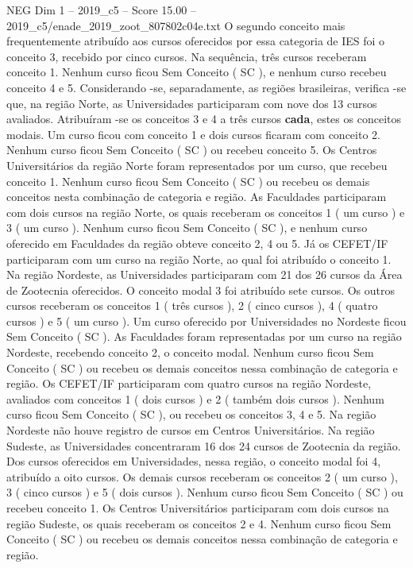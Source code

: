 \begin{textsample}{NEG Dim 1 – 2019\_c5 – Score 15.00 – 2019\_c5/enade\_2019\_zoot\_807802c04e.txt}
O segundo conceito mais frequentemente atribuído aos cursos oferecidos por essa categoria de IES foi o conceito 3, recebido por cinco cursos.
Na sequência, três cursos receberam conceito 1.
Nenhum curso ficou Sem Conceito ( SC ), e nenhum curso recebeu conceito 4 e 5.
Considerando -se, separadamente, as regiões brasileiras, verifica -se que, na região Norte, as Universidades participaram com nove dos 13 cursos avaliados.
Atribuíram -se os conceitos 3 e 4 a três cursos \textbf{cada}, estes os conceitos modais.
Um curso ficou com conceito 1 e dois cursos ficaram com conceito 2.
Nenhum curso ficou Sem Conceito ( SC ) ou recebeu conceito 5.
Os Centros Universitários da região Norte foram representados por um curso, que recebeu conceito 1.
Nenhum curso ficou Sem Conceito ( SC ) ou recebeu os demais conceitos nesta combinação de categoria e região.
As Faculdades participaram com dois cursos na região Norte, os quais receberam os conceitos 1 ( um curso ) e 3 ( um curso ).
Nenhum curso ficou Sem Conceito ( SC ), e nenhum curso oferecido em Faculdades da região obteve conceito 2, 4 ou 5.
Já os CEFET/IF participaram com um curso na região Norte, ao qual foi atribuído o conceito 1.
Na região Nordeste, as Universidades participaram com 21 dos 26 cursos da Área de Zootecnia oferecidos.
O conceito modal 3 foi atribuído sete cursos.
Os outros cursos receberam os conceitos 1 ( três cursos ), 2 ( cinco cursos ), 4 ( quatro cursos ) e 5 ( um curso ).
Um curso oferecido por Universidades no Nordeste ficou Sem Conceito ( SC ).
As Faculdades foram representadas por um curso na região Nordeste, recebendo conceito 2, o conceito modal.
Nenhum curso ficou Sem Conceito ( SC ) ou recebeu os demais conceitos nessa combinação de categoria e região.
Os CEFET/IF participaram com quatro cursos na região Nordeste, avaliados com conceitos 1 ( dois cursos ) e 2 ( também dois cursos ).
Nenhum curso ficou Sem Conceito ( SC ), ou recebeu os conceitos 3, 4 e 5.
Na região Nordeste não houve registro de cursos em Centros Universitários.
Na região Sudeste, as Universidades concentraram 16 dos 24 cursos de Zootecnia da região.
Dos cursos oferecidos em Universidades, nessa região, o conceito modal foi 4, atribuído a oito cursos.
Os demais cursos receberam os conceitos 2 ( um curso ), 3 ( cinco cursos ) e 5 ( dois cursos ).
Nenhum curso ficou Sem Conceito ( SC ) ou recebeu conceito 1.
Os Centros Universitários participaram com dois cursos na região Sudeste, os quais receberam os conceitos 2 e 4.
Nenhum curso ficou Sem Conceito ( SC ) ou recebeu os demais conceitos nessa combinação de categoria e região.

\end{textsample}

